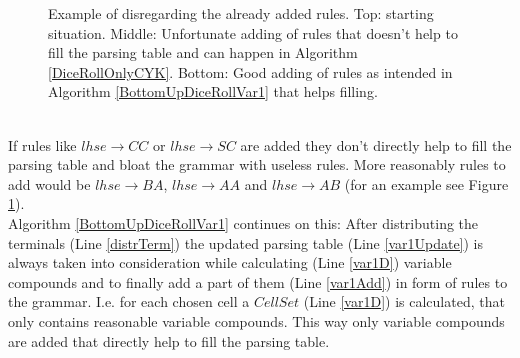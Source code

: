 \begin{figure}[h]
\begin{minipage}{6in}
\begin{minipage}{6in}
{{
	}	
}
\end{minipage}	
\end{minipage}
	\caption{Example of disregarding the already added rules. Top: starting situation. Middle: Unfortunate adding of rules that doesn't help to fill the parsing table and can happen in Algorithm \ref{DiceRollOnlyCYK}. Bottom: Good adding of rules as intended in Algorithm \ref{BottomUpDiceRollVar1} that helps filling.}
	\label{var1Example}
\end{figure}\\
If rules like $lhse \rightarrow CC$ or $lhse \rightarrow SC$ are added they don't directly help to fill the parsing table and bloat the grammar with useless rules. More reasonably rules to add would be $lhse \rightarrow BA$, $lhse \rightarrow AA$ and $lhse \rightarrow AB$ (for an example see Figure \ref{var1Example}).\\
\noindent Algorithm \ref{BottomUpDiceRollVar1} continues on this: After distributing the terminals (Line \ref{distrTerm}) the updated parsing table (Line \ref{var1Update}) is always taken into consideration while calculating (Line \ref{var1D}) variable compounds and to finally add a part of them (Line \ref{var1Add}) in form of rules to the grammar. I.e. for each chosen cell a $CellSet$ (Line \ref{var1D}) is calculated, that only contains reasonable variable compounds. This way only variable compounds are added that directly help to fill the parsing table.\\

